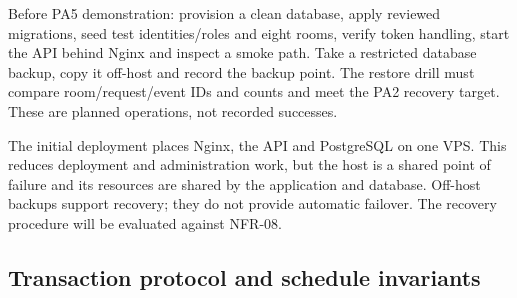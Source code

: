 Before PA5 demonstration: provision a clean database, apply reviewed migrations, seed test identities/roles and eight rooms, verify token handling, start the API behind Nginx and inspect a smoke path. Take a restricted database backup, copy it off-host and record the backup point. The restore drill must compare room/request/event IDs and counts and meet the PA2 recovery target. These are planned operations, not recorded successes.\par

The initial deployment places Nginx, the API and PostgreSQL on one VPS. This reduces deployment and administration work, but the host is a shared point of failure and its resources are shared by the application and database. Off-host backups support recovery; they do not provide automatic failover. The recovery procedure will be evaluated against NFR-08.\par

\subsection{Transaction protocol and schedule invariants}

